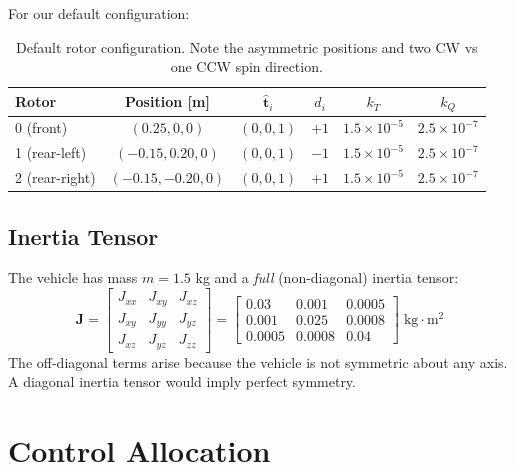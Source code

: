 \documentclass[12pt, a4paper]{article}
\newcommand{\bJ}{\bm{J}}
\begin{document}
For our default configuration:
\begin{table}[H]
\centering
\begin{tabular}{lccccc}
\toprule
\textbf{Rotor} & \textbf{Position} [m] & $\hat{\bm{t}}_i$ & $d_i$ & $k_T$ & $k_Q$ \\
\midrule
0 (front)       & $(0.25, 0, 0)$       & $(0,0,1)$ & $+1$ & $1.5\times10^{-5}$ & $2.5\times10^{-7}$ \\
1 (rear-left)   & $(-0.15, 0.20, 0)$   & $(0,0,1)$ & $-1$ & $1.5\times10^{-5}$ & $2.5\times10^{-7}$ \\
2 (rear-right)  & $(-0.15, -0.20, 0)$  & $(0,0,1)$ & $+1$ & $1.5\times10^{-5}$ & $2.5\times10^{-7}$ \\
\bottomrule
\end{tabular}
\caption{Default rotor configuration.  Note the asymmetric positions and two CW vs one CCW spin direction.}
\label{tab:rotors}
\end{table}

\subsection{Inertia Tensor}

The vehicle has mass $m = 1.5$ kg and a \emph{full} (non-diagonal) inertia tensor:
\begin{equation}
    \bJ = \begin{bmatrix} J_{xx} & J_{xy} & J_{xz} \\ J_{xy} & J_{yy} & J_{yz} \\ J_{xz} & J_{yz} & J_{zz} \end{bmatrix}
    = \begin{bmatrix} 0.03 & 0.001 & 0.0005 \\ 0.001 & 0.025 & 0.0008 \\ 0.0005 & 0.0008 & 0.04 \end{bmatrix}
    \; \text{kg}\cdot\text{m}^2
\end{equation}
The off-diagonal terms arise because the vehicle is not symmetric about any axis.  A diagonal inertia tensor would imply perfect symmetry.

\section{Control Allocation}
\label{sec:control_alloc}
\end{document}
